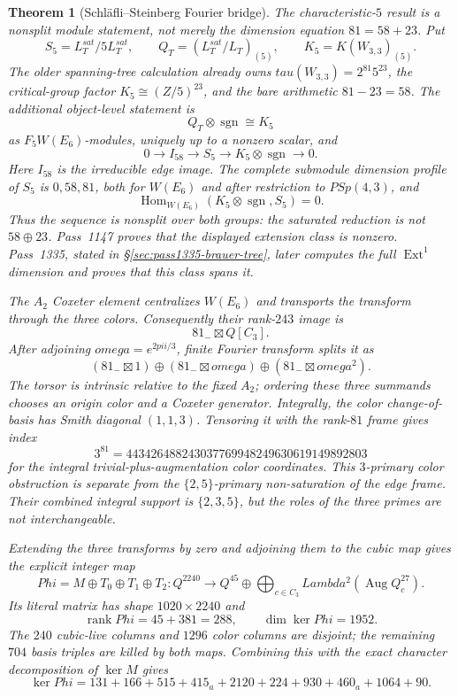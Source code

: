 \documentclass[12pt,a4paper]{article}
\def\mathbb#1{#1}%
\def\mathrm#1{#1}%
\def\mathbf#1{#1}%
\def\omega{omega}%
\def\Lambda{Lambda}%
\def\Phi#1{Phi#1}%
\def\pi{pi}%
\def\tau{tau}%
\def\cdot{ }%
\newtheorem{theorem}{Theorem}[section]
\theoremstyle{definition}
\begin{document}
\begin{theorem}[Schl\"afli--Steinberg Fourier bridge]
The characteristic-$5$ result is a nonsplit module statement, not merely
the dimension equation $81=58+23$.  Put
\[
 S_5=L_T^{\mathrm{sat}}/5L_T^{\mathrm{sat}},\qquad
 Q_T=(L_T^{\mathrm{sat}}/L_T)_{(5)},\qquad
 K_5=K(W_{3,3})_{(5)}.
\]
The older spanning-tree calculation already owns
$\tau(W_{3,3})=2^{81}5^{23}$, the critical-group factor
$K_5\cong(\mathbb Z/5)^{23}$, and the bare arithmetic $81-23=58$.
The additional object-level statement is
\[
 Q_T\otimes\operatorname{sgn}\cong K_5
\]
as $\mathbb F_5W(E_6)$-modules, uniquely up to a nonzero scalar, and
\[
 \boxed{0\longrightarrow I_{58}\longrightarrow S_5
 \longrightarrow K_5\otimes\operatorname{sgn}\longrightarrow0.}
\]
Here $I_{58}$ is the irreducible edge image.  The complete submodule
dimension profile of $S_5$ is $0,58,81$, both for $W(E_6)$ and after
restriction to $PSp(4,3)$, and
\[
 \operatorname{Hom}_{W(E_6)}
   (K_5\otimes\operatorname{sgn},S_5)=0.
\]
Thus the sequence is nonsplit over both groups: the saturated reduction
is not $\mathbf{58}\oplus\mathbf{23}$. Pass~1147 proves that the displayed
extension class is nonzero. Pass~1335, stated in
\S\ref{sec:pass1335-brauer-tree}, later computes the full
\(\operatorname{Ext}^1\) dimension and proves that this class spans it.

The $A_2$ Coxeter element centralizes $W(E_6)$ and transports the transform
through the three colors.  Consequently their rank-$243$ image is
\[
 81_-\boxtimes\mathbb Q[C_3].
\]
After adjoining $\omega=e^{2\pi i/3}$, finite Fourier transform splits it
as
\[
 (81_-\boxtimes1)\oplus
 (81_-\boxtimes\omega)\oplus
 (81_-\boxtimes\omega^2).
\]
The torsor is intrinsic relative to the fixed $A_2$; ordering these three
summands chooses an origin color and a Coxeter generator.
Integrally, the color change-of-basis has Smith diagonal $(1,1,3)$.
Tensoring it with the rank-$81$ frame gives index
\[
 3^{81}=443426488243037769948249630619149892803
\]
for the integral trivial-plus-augmentation color coordinates.  This
$3$-primary color obstruction is separate from the $\{2,5\}$-primary
non-saturation of the edge frame.  Their combined integral support is
$\{2,3,5\}$, but the roles of the three primes are not interchangeable.

Extending the three transforms by zero and adjoining them to the cubic
map gives the explicit integer map
\[
 \Phi=M\oplus T_0\oplus T_1\oplus T_2:
 \mathbb Q^{2240}\longrightarrow
 \mathbb Q^{45}\oplus
 \bigoplus_{c\in C_3}
 \Lambda^2(\operatorname{Aug}\mathbb Q^{27}_c).
\]
Its literal matrix has shape $1020\times2240$ and
\[
 \boxed{\operatorname{rank}\Phi=45+3\cdot81=288},
 \qquad
 \boxed{\dim\ker\Phi=1952}.
\]
The $240$ cubic-live columns and $1296$ color columns are disjoint; the
remaining $704$ basis triples are killed by both maps.  Combining this
with the exact character decomposition of $\ker M$ gives
\[
\ker\Phi=
13\cdot1+16\cdot6+5\cdot15+4\cdot15_a+21\cdot20+2\cdot24+
9\cdot30+4\cdot60_a+10\cdot64+90.
\]
\end{theorem}
\end{document}
